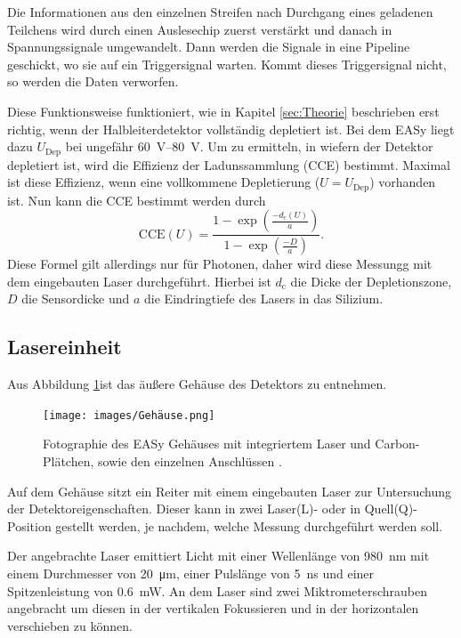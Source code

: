 \FloatBarrier
Die Informationen aus den einzelnen Streifen nach Durchgang eines geladenen
Teilchens wird durch einen Auslesechip zuerst verstärkt und danach in
Spannungssignale umgewandelt. Dann werden die Signale in eine Pipeline geschickt,
wo sie auf ein Triggersignal warten. Kommt dieses Triggersignal nicht, so werden
die Daten verworfen.

Diese Funktionsweise funktioniert, wie in Kapitel \ref{sec:Theorie} beschrieben
erst richtig, wenn der Halbleiterdetektor vollständig depletiert ist. Bei dem
EASy liegt dazu $U_\text{Dep}$ bei ungefähr \SIrange{60}{80}{\volt}. Um zu
ermitteln, in wiefern der Detektor depletiert ist, wird die Effizienz der
Ladunssammlung (CCE) bestimmt. Maximal ist diese Effizienz, wenn eine vollkommene
Depletierung ($U = U_\text{Dep}$) vorhanden ist. Nun kann die CCE bestimmt werden
durch
\begin{equation}
  \text{CCE}(U) = \frac{1 - \exp\left(\frac{-d_\text{c}(U)}{a}\right)}{1 - \exp\left(\frac{-D}{a}\right)}.
  \label{eqn:CCEL}
\end{equation}
Diese Formel gilt allerdings nur für Photonen, daher wird diese Messungg mit dem
eingebauten Laser durchgeführt.
Hierbei ist $d_\text{c}$ die Dicke der Depletionszone, $D$ die Sensordicke und
$a$ die Eindringtiefe des Lasers in das Silizium.

\subsection{Lasereinheit}
\label{sec:Lasereinheit}
Aus Abbildung \ref{fig:Gehäuse}ist das äußere Gehäuse des Detektors zu entnehmen.
\begin{figure}[htb]
  \centering
  \texttt{[image: images/Gehäuse.png]}
  \caption{Fotographie des EASy Gehäuses mit integriertem Laser und Carbon-Plätchen,
  sowie den einzelnen Anschlüssen \cite{anleitung}.}
  \label{fig:Gehäuse}
\end{figure}
\FloatBarrier
Auf dem Gehäuse sitzt ein Reiter mit einem eingebauten Laser zur Untersuchung der
Detektoreigenschaften. Dieser kann in zwei Laser(L)- oder in Quell(Q)-Position
gestellt werden, je nachdem, welche Messung durchgeführt werden soll.

Der angebrachte Laser emittiert Licht mit einer Wellenlänge von \SI{980}{\nano\meter}
mit einem Durchmesser von \SI{20}{\micro\meter}, einer Pulslänge von
\SI{5}{\nano\second} und einer Spitzenleistung von \SI{0.6}{\milli\watt}.
An dem Laser sind zwei Miktrometerschrauben angebracht um diesen in der vertikalen
Fokussieren und in der horizontalen verschieben zu können.

